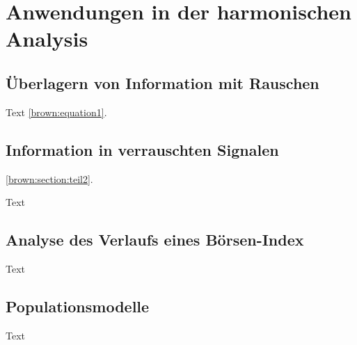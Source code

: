 %
%
%
%
\section{Anwendungen in der harmonischen Analysis\label{brown:section:teil2}}

\subsection{Überlagern von Information mit Rauschen
	\label{brown:subsection:verrauschteSignale}}
Text \eqref{brown:equation1}.

\subsection{Information in verrauschten Signalen
	\label{brown:subsection:informationInRauschen}}
\ref{brown:section:teil2}.

Text

\subsection{Analyse des Verlaufs eines Börsen-Index
\label{brown:subsection:boersenIndex}}

Text

\subsection{Populationsmodelle
\label{brown:subsection:popModelle}}

Text
